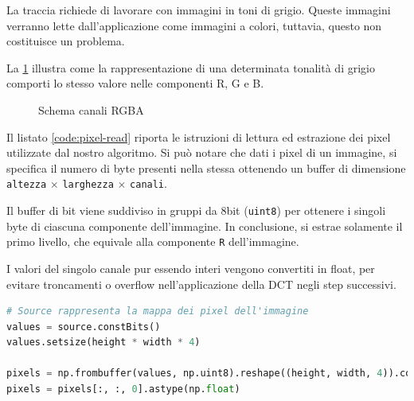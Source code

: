 \documentclass[11pt,italian]{article}
\begin{document}
La traccia richiede di lavorare con immagini in toni di grigio. Queste immagini verranno lette dall'applicazione come immagini a colori, tuttavia, questo non costituisce un problema.

La \cref{fig:channels} illustra come la rappresentazione di una determinata tonalità di grigio comporti lo stesso valore nelle componenti R, G e B.
\begin{figure}[H]
    \caption{Schema canali RGBA}
    \label{fig:channels}
\end{figure}

\noindent
Il listato \ref{code:pixel-read} riporta le istruzioni di lettura ed estrazione dei pixel utilizzate dal nostro algoritmo.
Si può notare che dati i pixel di un immagine, si specifica il numero di byte presenti nella stessa ottenendo un buffer di dimensione \lstinline{altezza} $\times$ \lstinline{larghezza} $\times$ \lstinline{canali}.

Il buffer di bit viene suddiviso in gruppi da 8bit (\lstinline{uint8}) per ottenere i singoli byte di ciascuna componente dell'immagine. In conclusione, si estrae solamente il primo livello, che equivale alla componente \lstinline{R} dell'immagine.

I valori del singolo canale pur essendo interi vengono convertiti in float, per evitare troncamenti o overflow nell'applicazione della DCT negli step successivi.

\begin{lstlisting}[language=Python,label=code:pixel-read,caption=Estrazione del canale R dall'immagine]
# Source rappresenta la mappa dei pixel dell'immagine
values = source.constBits()
values.setsize(height * width * 4)

pixels = np.frombuffer(values, np.uint8).reshape((height, width, 4)).copy()
pixels = pixels[:, :, 0].astype(np.float)
\end{lstlisting}
\end{document}
